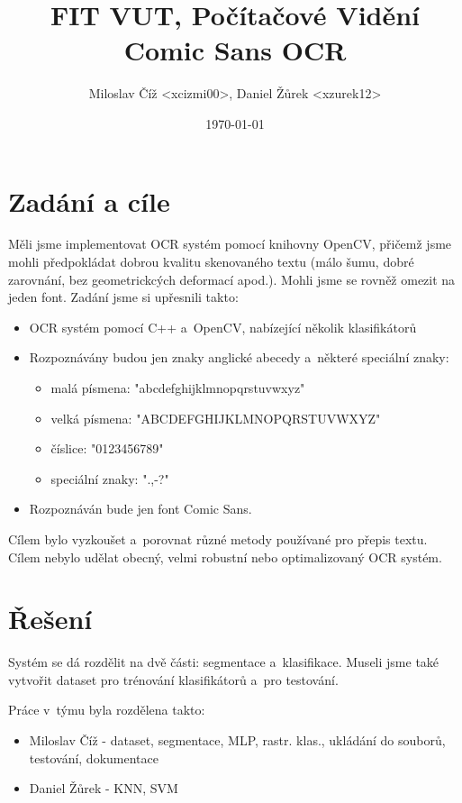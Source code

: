 \documentclass[12pt]{article}
\title{FIT VUT, Počítačové Vidění\\Comic Sans OCR}
\author{Miloslav Číž <xcizmi00>, Daniel Žůrek <xzurek12>}
\date{\today}
\begin{document}
\maketitle

\pagebreak[4]

\section{Zadání a cíle}

Měli jsme implementovat OCR systém pomocí knihovny OpenCV, přičemž jsme mohli
předpokládat dobrou kvalitu skenovaného textu (málo šumu, dobré zarovnání, bez geometrickcých
deformací apod.). Mohli jsme se rovněž omezit na jeden font. Zadání jsme si upřesnili takto:

\begin{itemize}
  \item OCR systém pomocí C++ a~OpenCV, nabízející několik klasifikátorů
  \item Rozpoznávány budou jen znaky anglické abecedy a~některé speciální znaky:
  \begin{itemize}
    \item malá písmena: "abcdefghijklmnopqrstuvwxyz"
    \item velká písmena: "ABCDEFGHIJKLMNOPQRSTUVWXYZ"
    \item číslice: "0123456789"
    \item speciální znaky: ".,-?"
  \end{itemize}
  \item Rozpoznáván bude jen font Comic Sans.
\end{itemize}

Cílem bylo vyzkoušet a~porovnat různé metody používané pro přepis textu. Cílem nebylo udělat
obecný, velmi robustní nebo optimalizovaný OCR systém.


\section{Řešení}

Systém se dá rozdělit na dvě části: segmentace a~klasifikace. Museli jsme také vytvořit
dataset pro trénování klasifikátorů a~pro testování.

Práce v~týmu byla rozdělena takto:

\begin{itemize}
  \item Miloslav Číž - dataset, segmentace, MLP, rastr. klas., ukládání do souborů, testování, dokumentace
  \item Daniel Žůrek - KNN, SVM
\end{itemize}
\end{document}
